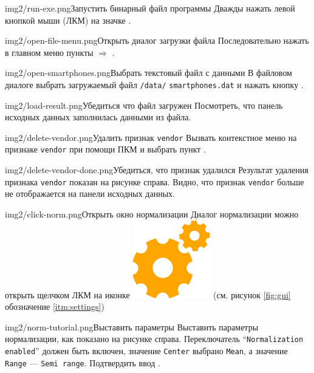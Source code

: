 \documentclass[12pt,tikz]{instruction}
\begin{document}
\begin{steps}
	\begin{ist}{img2/run-exe.png}{Запустить бинарный файл программы}		
		Дважды нажать левой кнопкой мыши (ЛКМ) на значке \ExeFile. 
	\end{ist}
	\begin{ist}{img2/open-file-menu.png}{Открыть диалог загрузки файла}		
		Последовательно нажать в главном меню пункты  $ \Rightarrow $ .
	\end{ist}
	\begin{ist}{img2/open-smartphones.png}{Выбрать текстовый файл с данными}
		В файловом диалоге выбрать загружаемый файл \texttt{\SysName /data/} \texttt{smartphones.dat} и нажать кнопку .
	\end{ist}
	\begin{ist}{img2/load-result.png}{Убедиться что файл загружен}
		Посмотреть, что панель исходных данных заполнилась данными из файла.		
	\end{ist}
	\begin{ist}{img2/delete-vendor.png}{Удалить признак \texttt{vendor}}
		Вызвать контекстное меню на признаке \texttt{vendor} при помощи ПКМ и выбрать пункт .
	\end{ist}
	\begin{ist}{img2/delete-vendor-done.png}{Убедиться, что признак удалился}
		Результат удаления признака \texttt{vendor} показан на рисунке справа. Видно, что признак \texttt{vendor} больше не отображается на панели исходных данных. 
	\end{ist}	
	\begin{ist}{img2/click-norm.png}{Открыть окно нормализации}
		Диалог нормализации можно открыть щелчком ЛКМ на иконке \includegraphics[scale=0.1]{img2/settings.png} (см. рисунок \ref{fig:gui} обозначение \ref{itm:settings})
	\end{ist}
	\begin{ist}{img2/norm-tutorial.png}{Выставить параметры}
		Выставить параметры нормализации, как показано на рисунке справа. Переключатель ``\texttt{Normalization enabled}'' должен быть включен, значение \texttt{Center} выбрано \texttt{Mean}, а значение \texttt{Range} --- \texttt{Semi range}. Подтвердить ввод . 

\end{ist}
\end{steps}
\end{document}
